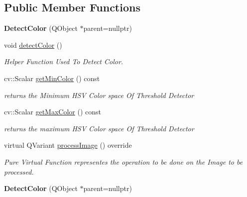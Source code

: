 \subsection*{Public Member Functions}
\begin{DoxyCompactItemize}
\item 
\mbox{\label{class_image_processor_1_1_detect_color_a2e6f1c8194a6f98bd9ef1f61c45ca96a}} 
{\bfseries Detect\+Color} (Q\+Object $\ast$parent=nullptr)
\item 
void \hyperlink{class_image_processor_1_1_detect_color_a2097eb7955a1f87fa5aa21944197fa17}{detect\+Color} ()
\begin{DoxyCompactList}\small\item\em Helper Function Used To Detect Color. \end{DoxyCompactList}\item 
cv\+::\+Scalar \hyperlink{class_image_processor_1_1_detect_color_a968a764ffc529d9a7022942c047559eb}{get\+Min\+Color} () const
\begin{DoxyCompactList}\small\item\em returns the Minimum H\+SV Color space Of Threshold Detector \end{DoxyCompactList}\item 
cv\+::\+Scalar \hyperlink{class_image_processor_1_1_detect_color_a80a162584cbb4f2ccb452f35bfee19f5}{get\+Max\+Color} () const
\begin{DoxyCompactList}\small\item\em returns the maximum H\+SV Color space Of Threshold Detector \end{DoxyCompactList}\item 
virtual Q\+Variant \hyperlink{class_image_processor_1_1_detect_color_afb14622f8e1390f1cf887cc8bf1da568}{process\+Image} () override
\begin{DoxyCompactList}\small\item\em Pure Virtual Function representes the operation to be done on the Image to be processed. \end{DoxyCompactList}\item 
\mbox{\label{class_image_processor_1_1_detect_color_ab93b6b40291a111e2fcf8dc50177e2a6}} 
{\bfseries Detect\+Color} (Q\+Object $\ast$parent=nullptr)
\item 
\mbox{\label{class_image_processor_1_1_detect_color_a6e1018c5535a0fa00f961b2bc82d4119}} 

\end{DoxyCompactItemize}
